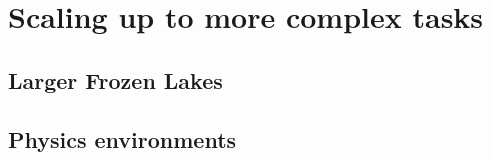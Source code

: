
\chapter{Scaling up to more complex tasks} %

\label{Chapter7} %


\section{Larger Frozen Lakes}


\section{Physics environments}


